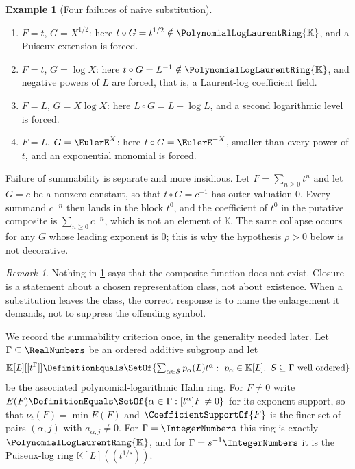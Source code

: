 \documentclass[11pt,oneside]{article}
\theoremstyle{plain}
\theoremstyle{definition}
\newtheorem{example}[theorem]{Example}
\theoremstyle{remark}
\newtheorem{remark}[theorem]{Remark}
\newcommand{\K}{\mathbb{K}}
\newcommand{\PLlau}{\PolynomialLogLaurentRing{\K}}       %
\newcommand{\ordt}{\nu_{t}}                              %
\newcommand{\compose}{\mathbin{\circ}}
\begin{document}
\begin{example}[Four failures of naive substitution]
\label{plt:ex:cmp-naive-failures}
\begin{enumerate}
\item \(F=t\), \(G=X^{1/2}\): here \(t\compose G=t^{1/2}\notin\PLlau\), and a
Puiseux extension is forced.
\item \(F=t\), \(G=\log X\): here \(t\compose G=L^{-1}\notin\PLlau\), and
negative powers of \(L\) are forced, that is, a Laurent-log coefficient field.
\item \(F=L\), \(G=X\log X\): here \(L\compose G=L+\log L\), and a second
logarithmic level is forced.
\item \(F=L\), \(G=\EulerE^{X}\): here \(t\compose G=\EulerE^{-X}\), smaller
than every power of \(t\), and an exponential monomial is forced.
\end{enumerate}
Failure of summability is separate and more insidious.  Let
\(F=\sum_{n\ge0}t^n\) and let \(G=c\) be a nonzero constant, so that
\(t\compose G=c^{-1}\) has outer valuation \(0\).  Every summand
\(c^{-n}\) then lands in the block \(t^0\), and the coefficient of \(t^0\) in
the putative composite is \(\sum_{n\ge0}c^{-n}\), which is not an element of
\(\K\).  The same collapse occurs for any \(G\) whose leading exponent is
\(0\); this is why the hypothesis \(\rho>0\) below is not decorative.
\end{example}

\begin{remark}
Nothing in \cref{plt:ex:cmp-naive-failures} says that the composite function
does not exist.  Closure is a statement about a chosen representation class,
not about existence.  When a substitution leaves the class, the correct
response is to name the enlargement it demands, not to suppress the offending
symbol.
\end{remark}

We record the summability criterion once, in the generality needed later.
Let \(\Gamma\subseteq\RealNumbers\) be an ordered additive subgroup and let
\[
 \K[L][[t^\Gamma]]
 \DefinitionEquals
 \SetOf{\textstyle\sum_{\alpha\in S}p_\alpha(L)t^\alpha
   :\ p_\alpha\in\K[L],\ S\subseteq\Gamma\text{ well ordered}}
\]
be the associated polynomial-logarithmic Hahn ring.  For \(F\ne0\) write
\(E(F)\DefinitionEquals\SetOf{\alpha\in\Gamma:[t^\alpha]F\ne0}\) for its
exponent support, so that \(\ordt(F)=\min E(F)\) and
\(\CoefficientSupportOf{F}\) is the finer set of pairs \((\alpha,j)\) with
\(a_{\alpha,j}\ne0\).  For \(\Gamma=\IntegerNumbers\) this ring is exactly
\(\PLlau\), and for \(\Gamma=s^{-1}\IntegerNumbers\) it is the Puiseux-log ring
\(\K[L]((t^{1/s}))\).
\end{document}
